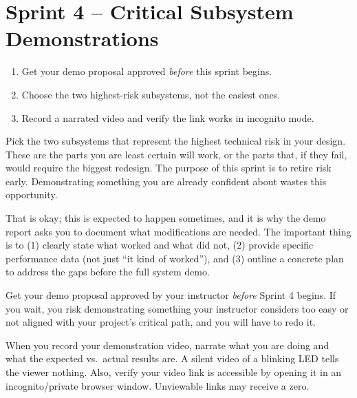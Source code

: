 \section{Sprint 4 -- Critical Subsystem Demonstrations}

\begin{priorities}
\begin{enumerate}[leftmargin=*, itemsep=1pt, topsep=0pt]
    \item Get your demo proposal approved \textit{before} this sprint begins.
    \item Choose the two highest-risk subsystems, not the easiest ones.
    \item Record a narrated video and verify the link works in incognito mode.
\end{enumerate}
\end{priorities}

\begin{faqbox}
Pick the two subsystems that represent the highest technical risk in your design. These are the parts you are least certain will work, or the parts that, if they fail, would require the biggest redesign. The purpose of this sprint is to retire risk early. Demonstrating something you are already confident about wastes this opportunity.
\end{faqbox}

\begin{faqbox}
That is okay; this is expected to happen sometimes, and it is why the demo report asks you to document what modifications are needed. The important thing is to (1) clearly state what worked and what did not, (2) provide specific performance data (not just ``it kind of worked''), and (3) outline a concrete plan to address the gaps before the full system demo.
\end{faqbox}

\begin{warnbox}
Get your demo proposal approved by your instructor \textit{before} Sprint 4 begins. If you wait, you risk demonstrating something your instructor considers too easy or not aligned with your project's critical path, and you will have to redo it.
\end{warnbox}

\begin{protip}
When you record your demonstration video, narrate what you are doing and what the expected vs.\ actual results are. A silent video of a blinking LED tells the viewer nothing. Also, verify your video link is accessible by opening it in an incognito/private browser window. Unviewable links may receive a zero.
\end{protip}

